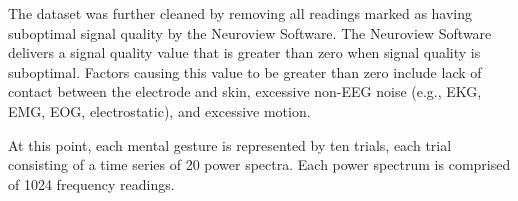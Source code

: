 The dataset was further cleaned by removing all readings marked as having suboptimal signal quality by the Neuroview Software. The Neuroview Software delivers a signal quality value that is greater than zero when signal quality is suboptimal. Factors causing this value to be greater than zero include lack of contact between the electrode and skin, excessive non-EEG noise (e.g., EKG, EMG, EOG, electrostatic), and excessive motion.

At this point, each mental gesture is represented by ten trials, each trial consisting of a time series of 20 power spectra. Each power spectrum is comprised of 1024 frequency readings. 